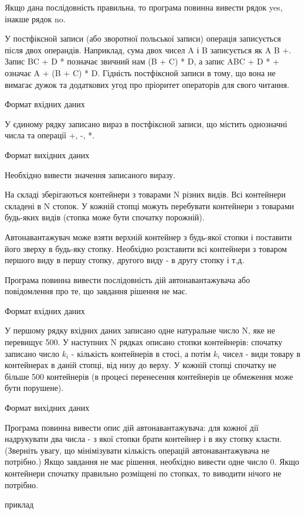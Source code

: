 \documentclass[]{article}
\begin{document}
\begin{enumerate}
Якщо дана послідовність правильна, то програма повинна вивести рядок yes, інакше рядок no.


У постфіксной записи (або зворотної польської записи) операція записується після двох операндів. Наприклад, сума двох чисел A і B записується як A B +. Запис BC + D * позначає звичний нам (B + C) * D, а запис ABC + D * + означає A + (B + C) * D. Гідність постфіксной записи в тому, що вона не вимагає дужок та додаткових угод про пріоритет операторів для свого читання.

Формат вхідних даних

У єдиному рядку записано вираз в постфіксной записи, що містить однозначні числа та операції +, -, *.

Формат вихідних даних

Необхідно вивести значення записаного виразу.


На складі зберігаються контейнери з товарами N різних видів. Всі контейнери складені в N стопок. У кожній стопці можуть перебувати контейнери з товарами будь-яких видів (стопка може бути спочатку порожній).

Автонавантажувач може взяти верхній контейнер з будь-якої стопки і поставити його зверху в будь-яку стопку. Необхідно розставити всі контейнери з товаром першого виду в першу стопку, другого виду - в другу стопку і т.д.

Програма повинна вивести послідовність дій автонавантажувача або повідомлення про те, що завдання рішення не має.

Формат вхідних даних

У першому рядку вхідних даних записано одне натуральне число N, яке не перевищує 500. У наступних N рядках описано стопки контейнерів: спочатку записано число $k_i$ - кількість контейнерів в стосі, а потім $k_i$ чисел - види товару в контейнерах в даній стопці, від низу до верху. У кожній стопці спочатку не більше 500 контейнерів (в процесі перенесення контейнерів це обмеження може бути порушене).

Формат вихідних даних

Програма повинна вивести опис дій автонавантажувача: для кожної дії надрукувати два числа - з якої стопки брати контейнер і в яку стопку класти. (Зверніть увагу, що мінімізувати кількість операцій автонавантажувача не потрібно.) Якщо завдання не має рішення, необхідно вивести одне число 0. Якщо контейнери спочатку правильно розміщені по стопках, то виводити нічого не потрібно.

приклад


\end{enumerate}
\end{document}

